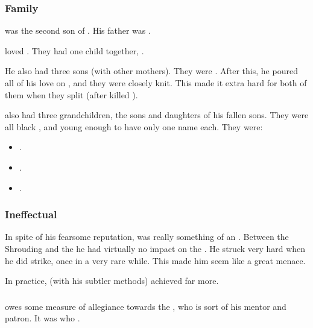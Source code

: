 \subsubsection{Family}
\Ishnaruchaefir was the second son of \TyarithXserasshana.
His father was . 

\Ishnaruchaefir{} loved \Triestessakhin. 
They had one child together, \Nzessuacrith. 

He also had three sons (with other mothers). 
They were . 
After this, he poured all of his love on \Nzessuacrith, and they were closely knit. 
This made it extra hard for both of them when they split (after \Ishnaruchaefir{} killed \Triestessakhin). 

\Ishnaruchaefir{} also had three grandchildren, the sons and daughters of his fallen sons. 
They were all black \dragons, and young enough to have only one name each. 
They were: 
\begin{itemize}
  \item {}. 
  \item {}. 
  \item {}. 
\end{itemize}





\subsubsection{Ineffectual}
In spite of his fearsome reputation, \Ishnaruchaefir was really something of an . 
Between the Shrouding and the \thirdbanewar he had virtually no impact on the \feud. 
He struck very hard when he did strike, once in a very rare while.
This made him seem like a great menace. 

In practice, \Secherdamon (with his subtler methods) achieved far more. 





\subsubsection{\NerrhanKoss}
\Ishnaruchaefir{} owes some measure of allegiance towards the \xs{} , who is sort of his mentor and patron. 
It was \NerrhanKoss{} who . 





